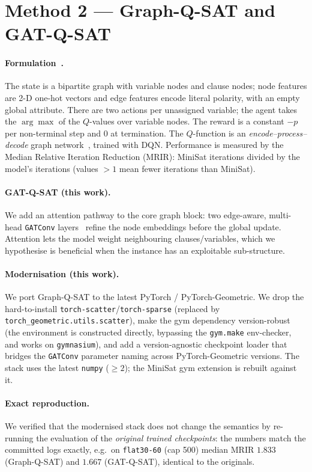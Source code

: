 \documentclass[11pt]{article}
\begin{document}
\section{Method 2 --- Graph-Q-SAT and GAT-Q-SAT}
\paragraph{Formulation~\cite{kurin2020}.} The state is a bipartite graph with
variable nodes and clause nodes; node features are 2-D one-hot vectors and edge
features encode literal polarity, with an empty global attribute. There are two
actions per unassigned variable; the agent takes the $\arg\max$ of the $Q$-values
over variable nodes. The reward is a constant $-p$ per non-terminal step and $0$ at
termination. The $Q$-function is an \emph{encode--process--decode} graph
network~\cite{battaglia2018}, trained with DQN. Performance is measured by the
Median Relative Iteration Reduction (MRIR): MiniSat iterations divided by the
model's iterations (values $>1$ mean fewer iterations than MiniSat).

\paragraph{GAT-Q-SAT (this work).} We add an attention pathway to the core graph
block: two edge-aware, multi-head \texttt{GATConv} layers~\cite{velickovic2018}
refine the node embeddings before the global update. Attention lets the model
weight neighbouring clauses/variables, which we hypothesise is beneficial when the
instance has an exploitable sub-structure.

\paragraph{Modernisation (this work).} We port Graph-Q-SAT to the latest
PyTorch / PyTorch-Geometric. We drop the hard-to-install
\texttt{torch-scatter}/\texttt{torch-sparse} (replaced by
\texttt{torch\_geometric.utils.scatter}), make the gym dependency version-robust
(the environment is constructed directly, bypassing the \texttt{gym.make}
env-checker, and works on \texttt{gymnasium}), and add a version-agnostic checkpoint
loader that bridges the \texttt{GATConv} parameter naming across
PyTorch-Geometric versions. The stack uses the latest \texttt{numpy} ($\geq 2$);
the MiniSat gym extension is rebuilt against it.

\paragraph{Exact reproduction.} We verified that the modernised stack does not
change the semantics by re-running the evaluation of the \emph{original trained
checkpoints}: the numbers match the committed logs exactly, e.g.\ on
\texttt{flat30-60} (cap 500) median MRIR $1.833$ (Graph-Q-SAT) and $1.667$
(GAT-Q-SAT), identical to the originals.
\end{document}
